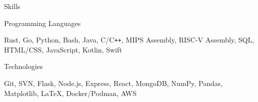 \documentclass{resume}
\begin{document}
\begin{rSection}{\large Skills}
\begin{rSubsection}{Programming Languages}{}{}{}
\item Rust, Go, Python, Bash, Java, C/C{}\verb!++!, MIPS Assembly, RISC-V Assembly, SQL, HTML/CSS, JavaScript, Kotlin, Swift 
\end{rSubsection}

\begin{rSubsection}{Technologies}{}{}{}
\item Git, SVN, Flask, Node.js, Express, React, MongoDB, NumPy, Pandas, Matplotlib, LaTeX, Docker/Podman, AWS
\end{rSubsection}


\end{rSection}
\end{document}
